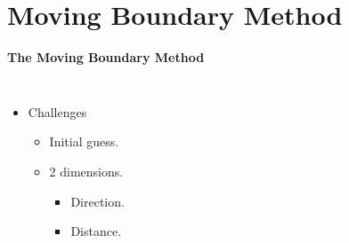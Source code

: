 \documentclass{beamer}
\begin{document}
\section{Moving Boundary Method}
\begin{frame}
{\bf The Moving Boundary Method}

\begin{columns}
\begin{itemize}
  \item Challenges
  \begin{itemize}
  \item Initial guess.
  \item 2 dimensions.
\begin{itemize}
  \item Direction.
  \item Distance.
\end{itemize}
  \end{itemize}
\end{itemize}
\end{columns}
\end{frame}
\end{document}
